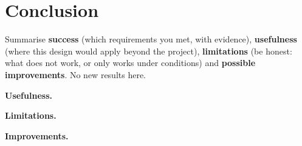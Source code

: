 \section{Conclusion}
\label{sec:conclusion}

\begin{guidance}
Summarise \textbf{success} (which requirements you met, with evidence),
\textbf{usefulness} (where this design would apply beyond the project),
\textbf{limitations} (be honest: what does not work, or only works under
conditions) and \textbf{possible improvements}. No new results here.
\end{guidance}


\textbf{Usefulness.} 

\textbf{Limitations.} 

\textbf{Improvements.} 
